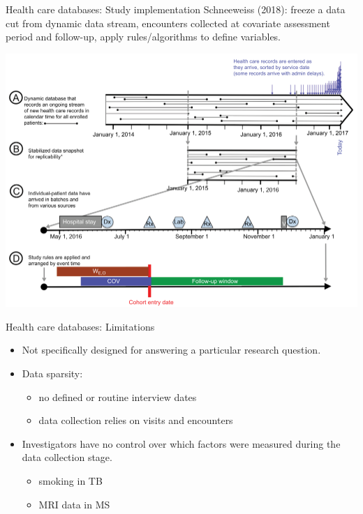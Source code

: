 \documentclass[
  ignorenonframetext,
  aspectratio=169]{beamer}
\providecommand{\tightlist}{%
  \setlength{\itemsep}{0pt}\setlength{\parskip}{0pt}}
\begin{document}
\begin{frame}{Health care databases: Study implementation}
\protect\hypertarget{health-care-databases-study-implementation}{}
Schneeweiss (2018): freeze a data cut from dynamic data stream,
encounters collected at covariate assessment period and follow-up, apply
rules/algorithms to define variables.

\begin{center}
\includegraphics[width=.5\linewidth]{implementation.png}
\end{center}
\end{frame}

\begin{frame}{Health care databases: Limitations}
\protect\hypertarget{health-care-databases-limitations}{}
\begin{itemize}
\tightlist
\item
  Not speciﬁcally designed for answering a particular research question.
\item
  Data sparsity:

  \begin{itemize}
  \tightlist
  \item
    no defined or routine interview dates
  \item
    data collection relies on visits and encounters
  \end{itemize}
\item
  Investigators have no control over which factors were measured during
  the data collection stage.

  \begin{itemize}
  \tightlist
  \item
    smoking in TB
  \item
    MRI data in MS
  \end{itemize}
\end{itemize}
\end{frame}
\end{document}

